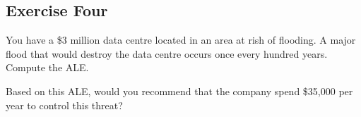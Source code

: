 \documentclass{article}
\begin{document}
\vspace{75mm}

\subsection*{Exercise Four}
You have a \$3 million data centre located in an area at rish of flooding. A major flood that would destroy the data centre occurs once every hundred years. Compute the ALE.

\vspace{60mm}

Based on this ALE, would you recommend that the company spend \$35,000 per year to control this threat?
\end{document}
